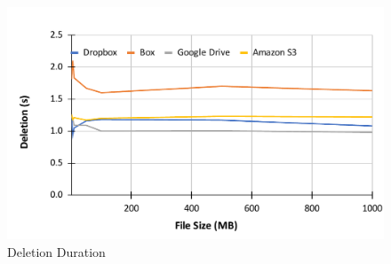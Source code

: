\begin{figure} [!h]
	\centering
	\includegraphics[scale=0.5]{images/deletion_chart}
	\caption{\label{fig:deletion_duration}Deletion Duration}
\end{figure}